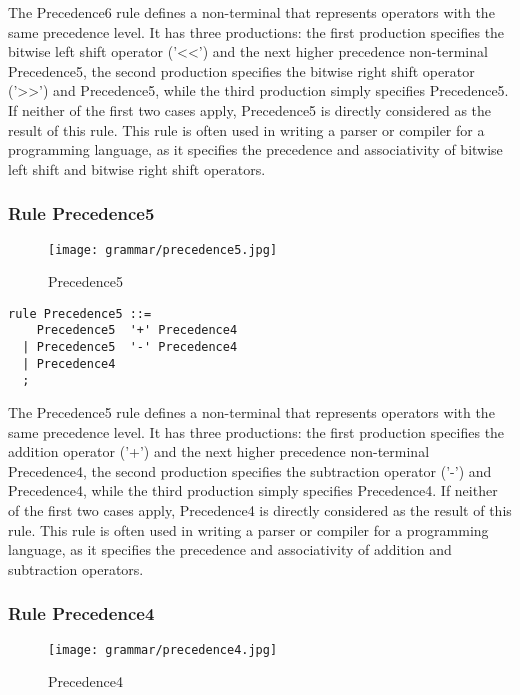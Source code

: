 The Precedence6 rule defines a non-terminal that represents operators with the same precedence level. It has three productions: the first production specifies the bitwise left shift operator ('<<') and the next higher precedence non-terminal Precedence5, the second production specifies the bitwise right shift operator ('>>') and Precedence5, while the third production simply specifies Precedence5. If neither of the first two cases apply, Precedence5 is directly considered as the result of this rule. This rule is often used in writing a parser or compiler for a programming language, as it specifies the precedence and associativity of bitwise left shift and bitwise right shift operators.

\subsubsection*{Rule Precedence5}

\begin{figure}[!ht]
\centering
\texttt{[image: grammar/precedence5.jpg]}
\caption{Precedence5}
\end{figure}

\begin{lstlisting}
rule Precedence5 ::=
    Precedence5  '+' Precedence4 
  | Precedence5  '-' Precedence4 
  | Precedence4 
  ;
\end{lstlisting}

The Precedence5 rule defines a non-terminal that represents operators with the same precedence level. It has three productions: the first production specifies the addition operator ('+') and the next higher precedence non-terminal Precedence4, the second production specifies the subtraction operator ('-') and Precedence4, while the third production simply specifies Precedence4. If neither of the first two cases apply, Precedence4 is directly considered as the result of this rule. This rule is often used in writing a parser or compiler for a programming language, as it specifies the precedence and associativity of addition and subtraction operators.

\subsubsection*{Rule Precedence4}

\begin{figure}[!ht]
\centering
\texttt{[image: grammar/precedence4.jpg]}
\caption{Precedence4}
\end{figure}

